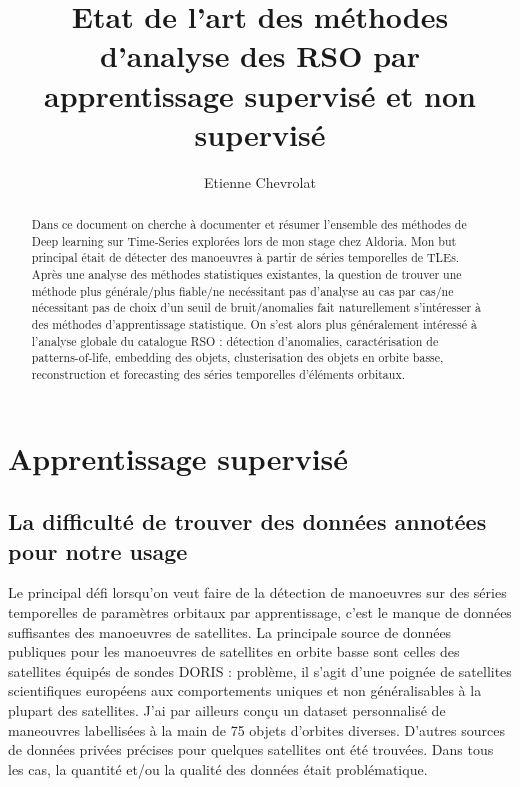 \documentclass{article}
\title{Etat de l'art des méthodes d'analyse des RSO par apprentissage supervisé et non supervisé}
\author{Etienne Chevrolat}
\date{}
\begin{document}
\maketitle

\begin{abstract}
    Dans ce document on cherche à documenter et résumer l'ensemble des méthodes de Deep learning sur Time-Series explorées lors de mon stage chez Aldoria.
    Mon but principal était de détecter des manoeuvres à partir de séries temporelles de TLEs. 
    Après une analyse des méthodes statistiques existantes, 
    la question de trouver une méthode plus générale/plus fiable/ne necéssitant pas d'analyse au cas par cas/ne nécessitant pas de choix d'un seuil de bruit/anomalies fait naturellement s'intéresser à des méthodes d'apprentissage statistique.  
    On s'est alors plus généralement intéressé à l'analyse globale du catalogue RSO : détection d'anomalies, caractérisation de patterns-of-life, embedding des objets, clusterisation des objets en orbite basse, reconstruction et forecasting des séries temporelles d'éléments orbitaux.
\end{abstract}

\section{Apprentissage supervisé}

\subsection{La difficulté de trouver des données annotées pour notre usage}
    Le principal défi lorsqu'on veut faire de la détection de manoeuvres sur des séries temporelles de paramètres orbitaux par apprentissage, c'est le manque de données suffisantes des manoeuvres de satellites.
    La principale source de données publiques pour les manoeuvres de satellites en orbite basse sont celles des satellites équipés de sondes DORIS : problème, il s'agit d'une poignée de satellites scientifiques européens aux comportements uniques et non généralisables à la plupart des satellites.
    J'ai par ailleurs conçu un dataset personnalisé de maneouvres labellisées à la main de 75 objets d'orbites diverses. D'autres sources de données privées précises pour quelques satellites ont été trouvées.
    Dans tous les cas, la quantité et/ou la qualité des données était problématique. 
\end{document}
